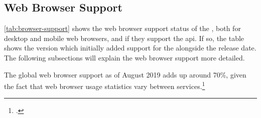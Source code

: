 \subsection{Web Browser Support}

\autoref{tab:browser-support} shows the web browser support status of the \wa{}, both for desktop and mobile web browsers, and if they support the \gls{api}. If so, the table shows the version which initially added support for the \wa{} alongside the release date. The following subsections will explain the web browser support more detailed.

The global web browser support as of August 2019 adds up around 70\%, given the fact that web browser usage statistics vary between services.\footcites[The obtained data is available in the Appendix \autoref{sec:stats}, see][]{statcounter-global}

\newpage

